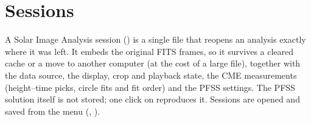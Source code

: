 \section{Sessions}
\label{sec:solar-sessions}

A Solar Image Analysis session () is a single file that reopens an analysis
exactly where it was left. It embeds the original FITS frames, so it survives a cleared
cache or a move to another computer (at the cost of a large file), together with the data
source, the display, crop and playback state, the CME measurements (height--time picks,
circle fits and fit order) and the PFSS settings. The PFSS solution itself is not stored; one
click on  reproduces it. Sessions are opened and saved from the
 menu (, ).
